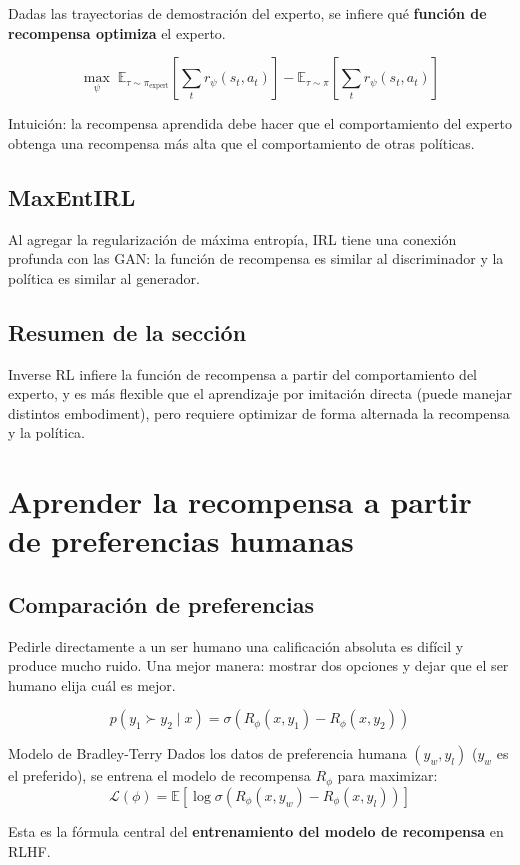 \documentclass[a4paper]{article}
\begin{document}
Dadas las trayectorias de demostración del experto, se infiere qué \textbf{función de recompensa optimiza} el experto.

$$\max_\psi \; \mathbb{E}_{\tau \sim \pi_{\text{expert}}}\left[\sum_t r_\psi(s_t, a_t)\right] - \mathbb{E}_{\tau \sim \pi}\left[\sum_t r_\psi(s_t, a_t)\right]$$

Intuición: la recompensa aprendida debe hacer que el comportamiento del experto obtenga una recompensa más alta que el comportamiento de otras políticas.

\subsection{MaxEntIRL}

Al agregar la regularización de máxima entropía, IRL tiene una conexión profunda con las GAN: la función de recompensa es similar al discriminador y la política es similar al generador.

\subsection{Resumen de la sección}

Inverse RL infiere la función de recompensa a partir del comportamiento del experto, y es más flexible que el aprendizaje por imitación directa (puede manejar distintos embodiment), pero requiere optimizar de forma alternada la recompensa y la política.

\section{Aprender la recompensa a partir de preferencias humanas}

\subsection{Comparación de preferencias}

Pedirle directamente a un ser humano una calificación absoluta es difícil y produce mucho ruido. Una mejor manera: mostrar dos opciones y dejar que el ser humano elija cuál es mejor.

$$p(y_1 \succ y_2 \mid x) = \sigma\left(R_\phi(x, y_1) - R_\phi(x, y_2)\right)$$

\begin{importantbox}{Modelo de Bradley-Terry}
Dados los datos de preferencia humana $(y_w, y_l)$ ($y_w$ es el preferido), se entrena el modelo de recompensa $R_\phi$ para maximizar:
$$\mathcal{L}(\phi) = \mathbb{E}\left[\log \sigma\left(R_\phi(x, y_w) - R_\phi(x, y_l)\right)\right]$$

Esta es la fórmula central del \textbf{entrenamiento del modelo de recompensa} en RLHF.
\end{importantbox}
\end{document}

